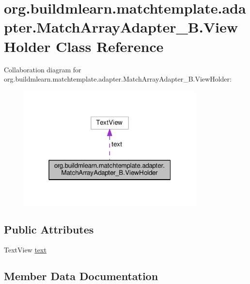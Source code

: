 \hypertarget{classorg_1_1buildmlearn_1_1matchtemplate_1_1adapter_1_1MatchArrayAdapter__B_1_1ViewHolder}{}\section{org.\+buildmlearn.\+matchtemplate.\+adapter.\+Match\+Array\+Adapter\+\_\+\+B.\+View\+Holder Class Reference}
\label{classorg_1_1buildmlearn_1_1matchtemplate_1_1adapter_1_1MatchArrayAdapter__B_1_1ViewHolder}


Collaboration diagram for org.\+buildmlearn.\+matchtemplate.\+adapter.\+Match\+Array\+Adapter\+\_\+\+B.\+View\+Holder\+:
\nopagebreak
\begin{figure}[H]
\begin{center}
\leavevmode
\includegraphics[width=268pt]{classorg_1_1buildmlearn_1_1matchtemplate_1_1adapter_1_1MatchArrayAdapter__B_1_1ViewHolder__coll__graph}
\end{center}
\end{figure}
\subsection*{Public Attributes}
\begin{DoxyCompactItemize}
\item 
Text\+View \hyperlink{classorg_1_1buildmlearn_1_1matchtemplate_1_1adapter_1_1MatchArrayAdapter__B_1_1ViewHolder_a1ca87dcafa34a416cd956629942ac2f5}{text}
\end{DoxyCompactItemize}


\subsection{Member Data Documentation}
